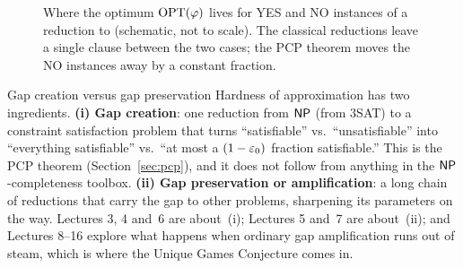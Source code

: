\begin{figure}[t]
\centering
{}
\caption{Where the optimum $\operatorname{OPT}(\varphi)$ lives for YES and NO instances of a reduction to
 (schematic, not to scale).  The classical reductions leave a single clause between the two
cases; the PCP theorem moves the NO instances away by a constant fraction.}
\label{fig:gap}
\end{figure}

\begin{bigpicture}{Gap creation versus gap preservation}
Hardness of approximation has two ingredients.  \textbf{(i) Gap creation}: one reduction from
$\mathsf{NP}$ (\eg from $3$SAT) to a constraint satisfaction problem that turns ``satisfiable'' vs.\
``unsatisfiable'' into ``everything satisfiable'' vs.\ ``at most a $(1-\varepsilon_0)$ fraction
satisfiable.''  This is the PCP theorem (Section~\ref{sec:pcp}), and it does not follow from
anything in the $\mathsf{NP}$-completeness toolbox.  \textbf{(ii) Gap preservation or
amplification}: a long chain of reductions that carry the gap to other problems, sharpening its
parameters on the way.  Lectures 3, 4 and~6 are about~(i); Lectures 5 and~7 are about~(ii); and Lectures 8--16 explore what
happens when ordinary gap amplification runs out of steam, which is where the Unique Games
Conjecture comes in.
\end{bigpicture}


